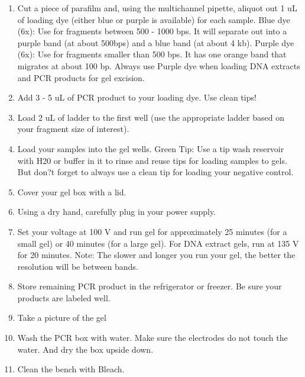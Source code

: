 \documentclass[11pt, oneside]{article}
\begin{document}
\begin{enumerate}
\begin{enumerate}
					\item Cut a piece of parafilm and, using the multichannel pipette, aliquot out 1 uL of loading dye (either blue or purple is available) 					for each sample. Blue dye (6x): Use for fragments between 500 - 1000 bps. It will separate out into a purple band (at about 500bps) 					and a blue band (at about 4 kb). Purple dye (6x): Use for fragments smaller than 500 bps. It has one orange band that migrates at 					about 100 bp. Always use Purple dye when loading DNA extracts and PCR products for gel excision. 
					\item Add 3 - 5 uL of PCR product to your loading dye. Use clean tips! 
					\item Load 2 uL of ladder to the first well (use the appropriate ladder based on your fragment size of interest).
					\item Load your samples into the gel wells.  Green Tip: Use a tip wash reservoir with H20 or buffer in it to rinse and reuse tips for 					loading samples to gels. But don?t forget to always use a clean tip for loading your negative control. 
					\item Cover your gel box with a lid.
					\item Using a dry hand, carefully plug in your power supply. 
					\item Set your voltage at 100 V and run gel for approximately 25 minutes (for a small gel) or 40 minutes (for a large gel). For DNA 					extract gels, run at 135 V for 20 minutes. Note: The slower and longer you run your gel, the better the resolution will be between 					bands. 
					\item Store remaining PCR product in the refrigerator or freezer. Be sure your products are labeled well. 
					\item Take a picture of the gel 
					\item Wash the PCR box with water. Make sure the electrodes do not touch the water. And dry the box upside down. 
					\item Clean the bench with Bleach. 
			\end{enumerate}
		\end{enumerate}
	
		\vspace{3mm}
	
\end{document}

